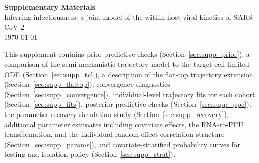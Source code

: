 \newcommand{\suppprefix}{S}
\newcommand{\suppfigpath}{../../output/figures/pnas}
\setcounter{page}{0}

\begin{appendix}

    \renewcommand{\thefigure}{\suppprefix\arabic{figure}}
    \setcounter{figure}{0}

    \renewcommand{\thetable}{\suppprefix\arabic{table}}
    \setcounter{table}{0}

    \renewcommand{\theequation}{\suppprefix\arabic{equation}}
    \setcounter{equation}{0}

    \renewcommand{\thesection}{\suppprefix\arabic{section}}
    \setcounter{section}{0}

    \newpage
    \begin{center}
        {\Large \textbf{Supplementary Materials}} \\[0.5em]
        {\large Inferring infectiousness: a joint model of the within-host viral kinetics of SARS-CoV-2} \\[0.5em]
        \today
    \end{center}
    \vspace{1em}

    \noindent This supplement contains prior predictive checks (Section~\ref{sec:supp_prior}), a comparison of the semi-mechanistic trajectory model to the target cell limited ODE (Section~\ref{sec:supp_tcl}), a description of the flat-top trajectory extension (Section~\ref{sec:supp_flattop}), convergence diagnostics (Section~\ref{sec:supp_convergence}), individual-level trajectory fits for each cohort (Section~\ref{sec:supp_fits}), posterior predictive checks (Section~\ref{sec:supp_ppc}), the parameter recovery simulation study (Section~\ref{sec:supp_recovery}), additional parameter estimates including covariate effects, the RNA-to-PFU transformation, and the individual random effect correlation structure (Section~\ref{sec:supp_params}), and covariate-stratified probability curves for testing and isolation policy (Section~\ref{sec:supp_strat}).


\end{appendix}
